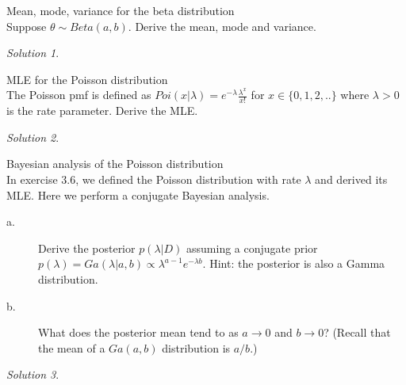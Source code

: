 \documentclass[a4paper,twoside=false,abstract=false,numbers=noenddot,
titlepage=false,headings=small,parskip=half,version=last]{scrartcl}
\theoremstyle{definition}
\theoremstyle{remark}
\newtheorem*{solution}{Solution}
\newenvironment{exercise}[2][Exercise]{
    \begin{trivlist}
        \item[\hskip \labelsep {\bfseries #1}\hskip \labelsep {\bfseries #2}]}{
    \end{trivlist}
}
\begin{document}

\thispagestyle{empty}

\begin{exercise}{2.16} Mean, mode, variance for the beta distribution \\
    Suppose $\theta \sim Beta(a,b)$. Derive the mean, mode and variance.
\end{exercise}
\begin{solution}

\end{solution}

\begin{exercise}{3.6} MLE for the Poisson distribution \\
    The Poisson pmf is defined as
    $Poi(x|\lambda)=e^{-\lambda}\frac{\lambda^x}{x!}$ for $x \in \{0,1,2,..\}$
    where $\lambda>0$ is the rate parameter. Derive the MLE. 
\end{exercise}
\begin{solution}

\end{solution}

\begin{exercise}{3.7} Bayesian analysis of the Poisson distribution \\
    In exercise 3.6, we defined the Poisson distribution with rate $\lambda$
    and derived its MLE. Here we perform a conjugate Bayesian analysis. 
    \begin{description}
        \item[a.] Derive the posterior $p(\lambda|D)$ assuming a conjugate
            prior $p(\lambda)=Ga(\lambda|a,b)\propto
            \lambda^{a-1}e^{-\lambda b}$. Hint: the posterior is also a Gamma
            distribution. 
        \item[b.] What does the posterior mean tend to as $a\rightarrow 0$ and
            $b\rightarrow 0$? (Recall that the mean of a $Ga(a,b)$ distribution
            is $a/b$.)
    \end{description}
\end{exercise}
\begin{solution}
\end{solution}

\end{document}

